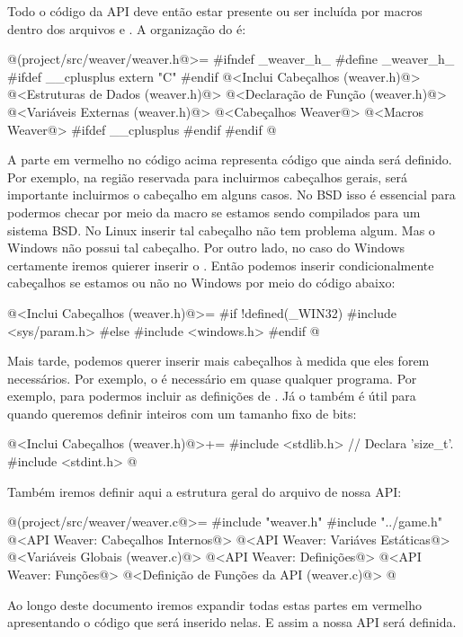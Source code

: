 Todo o código da API deve então estar presente ou ser incluída por
macros dentro dos arquivos 
e . A organização do  é:

\iniciocodigo
@(project/src/weaver/weaver.h@>=
#ifndef _weaver_h_
#define _weaver_h_
#ifdef __cplusplus
  extern "C" {
#endif
@<Inclui Cabeçalhos (weaver.h)@>
@<Estruturas de Dados (weaver.h)@>
@<Declaração de Função (weaver.h)@>
@<Variáveis Externas (weaver.h)@>
@<Cabeçalhos Weaver@>
@<Macros Weaver@>
#ifdef __cplusplus
  }
#endif
#endif
@
\fimcodigo

A parte em vermelho no código acima representa código que ainda será
definido. Por exemplo, na região reservada para incluirmos cabeçalhos
gerais, será importante incluirmos o
cabeçalho  em alguns casos. No BSD isso é
essencial para podermos checar por meio da macro se estamos sendo
compilados para um sistema BSD. No Linux inserir tal cabeçalho não tem
problema algum. Mas o Windows não possui tal cabeçalho. Por outro
lado, no caso do Windows certamente iremos quierer inserir
o . Então podemos inserir condicionalmente
cabeçalhos se estamos ou não no Windows por meio do código abaixo:

\iniciocodigo
@<Inclui Cabeçalhos (weaver.h)@>=
#if !defined(_WIN32)
#include <sys/param.h>
#else
#include <windows.h>
#endif
@
\fimcodigo

Mais tarde, podemos querer inserir mais cabeçalhos à medida que eles
forem necessários. Por exemplo, o  é necessário
em quase qualquer programa. Por exemplo, para podermos incluir as
definições de . Já o  também
é útil para quando queremos definir inteiros com um tamanho fixo de
bits:

\iniciocodigo
@<Inclui Cabeçalhos (weaver.h)@>+=
#include <stdlib.h> // Declara 'size_t'.
#include <stdint.h>
@
\fimcodigo

Também iremos definir aqui a estrutura geral do
arquivo  de nossa API:

\iniciocodigo
@(project/src/weaver/weaver.c@>=
#include "weaver.h"
#include "../game.h"
@<API Weaver: Cabeçalhos Internos@>
@<API Weaver: Variáves Estáticas@>
@<Variáveis Globais (weaver.c)@>
@<API Weaver: Definições@>
@<API Weaver: Funções@>
@<Definição de Funções da API (weaver.c)@>
@
\fimcodigo


Ao longo deste documento iremos expandir todas estas partes em
vermelho apresentando o código que será inserido nelas. E assim a
nossa API será definida.

